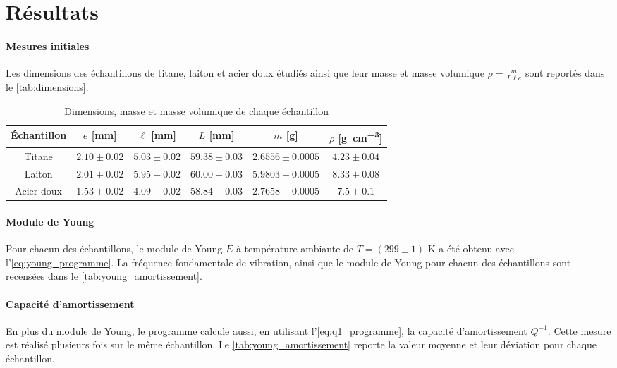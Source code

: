 \section{Résultats}

\paragraph{Mesures initiales} Les dimensions des échantillons de titane, laiton et acier doux étudiés ainsi que leur masse et masse volumique \(\rho = \frac{m}{L \ell e}\) sont reportés dans le \autoref{tab:dimensions}.

\begin{table}[h]
    \centering
    \begin{tabulary}{0.7\linewidth}{c|c c c c c}
        \toprule
        Échantillon & \(e\) [\si{\milli\meter}] & \(\ell\) [\si{\milli\meter}] & \(L\) [\si{\milli\meter}] & \(m\) [\si{\gram}] & \(\rho\) [\si{\gram\per\cubic\centi\meter}] \\
        \midrule
        Titane & \(2.10 \pm 0.02\) & \(5.03 \pm 0.02\) & \(59.38 \pm 0.03\) & \(2.6556 \pm 0.0005\) & \(4.23 \pm 0.04\) \\
        Laiton & \(2.01 \pm 0.02\) & \(5.95 \pm 0.02\) & \(60.00 \pm 0.03\) & \(5.9803 \pm 0.0005\) & \(8.33 \pm 0.08\) \\
        Acier doux & \(1.53 \pm 0.02\) & \(4.09 \pm 0.02\) & \(58.84 \pm 0.03\) & \(2.7658 \pm 0.0005\) & \(7.5 \pm 0.1\) \\
        \bottomrule
    \end{tabulary}
    \caption{Dimensions, masse et masse volumique de chaque échantillon}
    \label{tab:dimensions}
\end{table}

\paragraph{Module de Young} Pour chacun des échantillons, le module de Young \(E\) à température ambiante de \(T = (299 \pm 1)\) \si{\kelvin} a été obtenu avec l'\autoref{eq:young_programme}. La fréquence fondamentale de vibration, ainsi que le module de Young pour chacun des échantillons sont recensées dans le \autoref{tab:young_amortissement}.

\paragraph{Capacité d'amortissement} En plus du module de Young, le programme calcule aussi, en utilisant l'\autoref{eq:q1_programme}, la capacité d'amortissement \(Q^{-1}\). Cette mesure est réalisé plusieurs fois sur le même échantillon. Le \autoref{tab:young_amortissement} reporte la valeur moyenne et leur déviation pour chaque échantillon.

